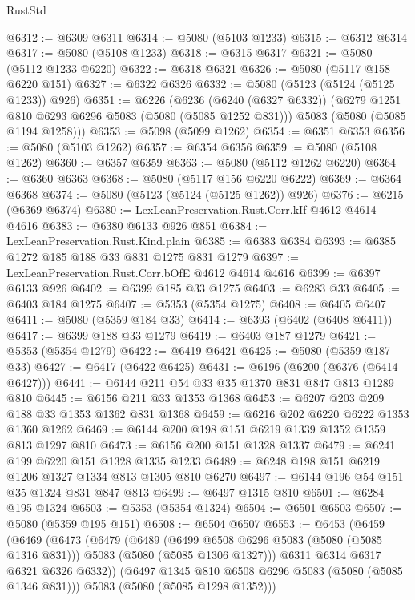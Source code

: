 \begin{lexlean}{RustStd}
\begin{coremodule}
{\begin{coremodule}
{{{{{@6312 := @6309 @6311
@6314 := @5080 (@5103 @1233)
@6315 := @6312 @6314
@6317 := @5080 (@5108 @1233)
@6318 := @6315 @6317
@6321 := @5080 (@5112 @1233 @6220)
@6322 := @6318 @6321
@6326 := @5080 (@5117 @158 @6220 @151)
@6327 := @6322 @6326
@6332 := @5080 (@5123 (@5124 (@5125 @1233)) @926)
@6351 := @6226
    (@6236
      (@6240 (@6327 @6332))
      (@6279 @1251 @810 @6293 @6296 @5083 (@5080 (@5085 @1252 @831)))
      @5083
      (@5080 (@5085 @1194 @1258)))
@6353 := @5098 (@5099 @1262)
@6354 := @6351 @6353
@6356 := @5080 (@5103 @1262)
@6357 := @6354 @6356
@6359 := @5080 (@5108 @1262)
@6360 := @6357 @6359
@6363 := @5080 (@5112 @1262 @6220)
@6364 := @6360 @6363
@6368 := @5080 (@5117 @156 @6220 @6222)
@6369 := @6364 @6368
@6374 := @5080 (@5123 (@5124 (@5125 @1262)) @926)
@6376 := @6215 (@6369 @6374)
@6380 := LexLeanPreservation.Rust.Corr.kIf @4612 @4614 @4616
@6383 := @6380 @6133 @926 @851
@6384 := LexLeanPreservation.Rust.Kind.plain
@6385 := @6383 @6384
@6393 := @6385 @1272 @185 @188 @33 @831 @1275 @831 @1279
@6397 := LexLeanPreservation.Rust.Corr.bOfE @4612 @4614 @4616
@6399 := @6397 @6133 @926
@6402 := @6399 @185 @33 @1275
@6403 := @6283 @33
@6405 := @6403 @184 @1275
@6407 := @5353 (@5354 @1275)
@6408 := @6405 @6407
@6411 := @5080 (@5359 @184 @33)
@6414 := @6393 (@6402 (@6408 @6411))
@6417 := @6399 @188 @33 @1279
@6419 := @6403 @187 @1279
@6421 := @5353 (@5354 @1279)
@6422 := @6419 @6421
@6425 := @5080 (@5359 @187 @33)
@6427 := @6417 (@6422 @6425)
@6431 := @6196 (@6200 (@6376 (@6414 @6427)))
@6441 := @6144 @211 @54 @33 @35 @1370 @831 @847 @813 @1289 @810
@6445 := @6156 @211 @33 @1353 @1368
@6453 := @6207 @203 @209 @188 @33 @1353 @1362 @831 @1368
@6459 := @6216 @202 @6220 @6222 @1353 @1360 @1262
@6469 := @6144 @200 @198 @151 @6219 @1339 @1352 @1359 @813 @1297 @810
@6473 := @6156 @200 @151 @1328 @1337
@6479 := @6241 @199 @6220 @151 @1328 @1335 @1233
@6489 := @6248 @198 @151 @6219 @1206 @1327 @1334 @813 @1305 @810 @6270
@6497 := @6144 @196 @54 @151 @35 @1324 @831 @847 @813
@6499 := @6497 @1315 @810
@6501 := @6284 @195 @1324
@6503 := @5353 (@5354 @1324)
@6504 := @6501 @6503
@6507 := @5080 (@5359 @195 @151)
@6508 := @6504 @6507
@6553 := @6453
    (@6459
      (@6469
        (@6473
          (@6479
            (@6489
              (@6499 @6508 @6296 @5083 (@5080 (@5085 @1316 @831)))
              @5083
              (@5080 (@5085 @1306 @1327)))
            @6311
            @6314
            @6317
            @6321
            @6326
            @6332))
        (@6497 @1345 @810 @6508 @6296 @5083 (@5080 (@5085 @1346 @831)))
        @5083
        (@5080 (@5085 @1298 @1352)))
}}}}}
\end{coremodule}}
\end{coremodule}
\end{lexlean}

